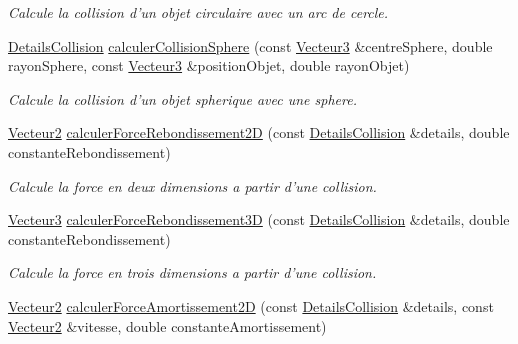 \begin{DoxyCompactItemize}
\begin{DoxyCompactList}\small\item\em Calcule la collision d'un objet circulaire avec un arc de cercle. \end{DoxyCompactList}\item 
\hyperlink{classaidecollision_1_1_details_collision}{Details\-Collision} \hyperlink{namespaceaidecollision_ab4172fb76b2ff4925328f52459a134ab}{calculer\-Collision\-Sphere} (const \hyperlink{group__utilitaire_ga541aa4837ad9250d3a248dc82ee9ad4d}{Vecteur3} \&centre\-Sphere, double rayon\-Sphere, const \hyperlink{group__utilitaire_ga541aa4837ad9250d3a248dc82ee9ad4d}{Vecteur3} \&position\-Objet, double rayon\-Objet)
\begin{DoxyCompactList}\small\item\em Calcule la collision d'un objet spherique avec une sphere. \end{DoxyCompactList}\item 
\hyperlink{group__utilitaire_ga6f7808e68c967b90bd7e737b7e1b78de}{Vecteur2} \hyperlink{namespaceaidecollision_adfb0d490d1e7e1eb0b7d34a7ecba982f}{calculer\-Force\-Rebondissement2\-D} (const \hyperlink{classaidecollision_1_1_details_collision}{Details\-Collision} \&details, double constante\-Rebondissement)
\begin{DoxyCompactList}\small\item\em Calcule la force en deux dimensions a partir d'une collision. \end{DoxyCompactList}\item 
\hyperlink{group__utilitaire_ga541aa4837ad9250d3a248dc82ee9ad4d}{Vecteur3} \hyperlink{namespaceaidecollision_aeb5fa0c355658723c12093e3c65dfca3}{calculer\-Force\-Rebondissement3\-D} (const \hyperlink{classaidecollision_1_1_details_collision}{Details\-Collision} \&details, double constante\-Rebondissement)
\begin{DoxyCompactList}\small\item\em Calcule la force en trois dimensions a partir d'une collision. \end{DoxyCompactList}\item 
\hyperlink{group__utilitaire_ga6f7808e68c967b90bd7e737b7e1b78de}{Vecteur2} \hyperlink{namespaceaidecollision_ab12dd816a00b79e23993bc1e27fd7859}{calculer\-Force\-Amortissement2\-D} (const \hyperlink{classaidecollision_1_1_details_collision}{Details\-Collision} \&details, const \hyperlink{group__utilitaire_ga6f7808e68c967b90bd7e737b7e1b78de}{Vecteur2} \&vitesse, double constante\-Amortissement)
\item 

\end{DoxyCompactItemize}
